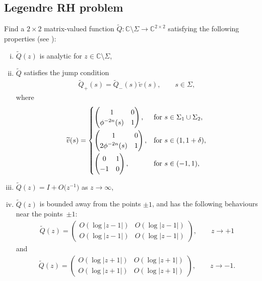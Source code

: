 \documentclass[11pt]{article}
\numberwithin{equation}{section}
\newcommand{\C}{\mathbb{C}}
\newcommand{\Id}{I}
\newcommand{\tQ}{{\widetilde Q}}
\newcommand{\tv}{{\widetilde v}}
\numberwithin{equation}{section}
\begin{document}
\subsection{Legendre RH problem}\label{LegRHP} Find a $2\times2$ matrix-valued function $\tQ \colon \C \setminus \Sigma \to \C^{2\times2}$ satisfying the following properties (see \cite[Section~3.4]{CD}):
\begin{enumerate}[(i)]\itemsep=0pt
 \item $\tQ(z)$ is analytic for $z \in \C \setminus \Sigma$,
 \item $\tQ$ satisfies the jump condition
 \begin{align*}
 \tQ_+(s) = \tQ_-(s) \tv(s), \qquad s\in \Sigma,
 \end{align*}
 where
 \begin{align*}
\tv(s) =
\begin{cases}
\begin{pmatrix}
1 & 0
\\
\phi^{-2n}(s) & 1
\end{pmatrix}, & \mbox{for}\ s \in \Sigma_1 \cup \Sigma_2,\vspace{1mm}
\\
\begin{pmatrix}
1 & 0
\\
2\phi^{-2n}(s) & 1
\end{pmatrix}, & \mbox{for}\ s\in(1,1+\delta),\vspace{1mm}
\\
\begin{pmatrix}
0 & 1
\\
-1 & 0
\end{pmatrix}, & \mbox{for}\ s \in (-1,1),
\end{cases}
\end{align*}
\item $\tQ(z) = \Id + O\big(z^{-1}\big)$ as $z \rightarrow \infty$,
\item $\tQ(z)$ is bounded away from the points $\pm 1$, and has the following behaviours near the points~$\pm1$:
\begin{align*}
 \tQ(z) = \begin{pmatrix}
 O(\log|z-1|) & O(\log|z-1|)
 \\
 O(\log|z-1|) & O(\log|z-1|)
 \end{pmatrix}, \qquad z\to +1
\end{align*}
and
\begin{align*}
 \tQ(z) = \begin{pmatrix}
 O(\log|z+1|) & O(\log|z+1|)
 \\
 O(\log|z+1|) & O(\log|z+1|)
 \end{pmatrix}, \qquad z \to -1.
\end{align*}
\end{enumerate}
\end{document}
